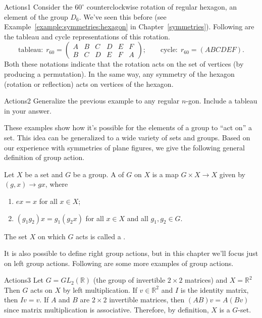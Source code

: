 \begin{example}{Actions1} 
Consider the $60^{\circ}$ counterclockwise rotation of regular hexagon, an element of the group $D_6$.  We've seen this before (see Example~\ref{example:symmetries:hexagon} in Chapter~\ref{symmetries}). Following are the tableau and cycle representations of this rotation. 
\[ \text{tableau:}~~r_{60} = \begin{pmatrix} A & B & C & D & E & F \\ B & C & D & E & F  & A \end{pmatrix}; \qquad 
\text{cycle:}~~r_{60}=(A B C D E F).\]
 Both these notations indicate that the rotation acts on the set of vertices (by producing a permutation).  In the same way, any symmetry of the hexagon (rotation or reflection) acts on vertices of the hexagon.
\end{example}
	\begin {exercise}{Actions2}  Generalize the previous example to any regular $n$-gon. Include a tableau in your answer.
\end {exercise}
These examples show how it's possible for the elements of a group to ``act on'' a set. This idea can be generalized to a wide variety of sets and groups. Based on our experience with symmetries of plane figures, we give the following  general definition of group action. 

\begin{defn}
Let $X$ be a set and $G$ be a group. A  of $G$ on $X$ is a map $G\times X\rightarrow X$
given by $(g, x)\rightarrow gx$, where
\begin{enumerate}[(1)]
\item $ex = x$ for all $x\in X$;
\item $(g_1g_2)x = g_1(g_2x)$ for all $x\in X$ and all $g_1, g_2 \in G$.
\end{enumerate}
The set $X$  on which $G$ acts is called a  .
\end{defn}
It is also possible to define right group actions, but in this chapter we'll focus just on left group actions.  Following are some more examples of group actions.

\begin{example}{Actions3}
 Let $G = GL_2(\mathbb{R})$ (the group of invertible $2 \times 2$ matrices) and $X = \mathbb{R}^2$
Then $G$ acts on $X$ by left multiplication. If $v\in \mathbb{ R}^2$
and $I$ is the identity matrix, then $Iv = v$. If $A$ and $B$ are $2 \times 2$
invertible matrices, then $(AB)v = A(Bv)$ since matrix multiplication is associative.  Therefore, by definition, $X$ is a $G$-set.\end{example}

